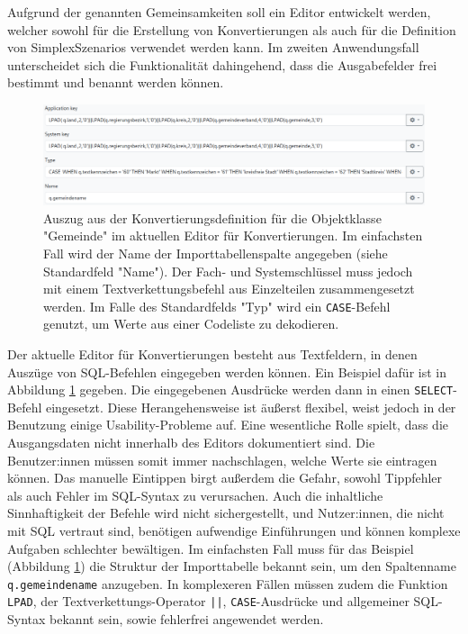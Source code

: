 Aufgrund der genannten Gemeinsamkeiten soll ein Editor entwickelt werden, welcher sowohl für die Erstellung von Konvertierungen als auch für die Definition von SimplexSzenarios verwendet werden kann. Im zweiten Anwendungsfall unterscheidet sich die Funktionalität dahingehend, dass die Ausgabefelder frei bestimmt und benannt werden können.

\begin{figure}[ht]
  \centering
  \includegraphics[width=.95\textwidth]{assets/conversion-gemeinde.png}
  \caption[Auszug einer Konvertierungsdefinition im aktuellen Editor]{Auszug aus der Konvertierungsdefinition für die Objektklasse "Gemeinde" im aktuellen Editor für Konvertierungen. Im einfachsten Fall wird der Name der Importtabellenspalte angegeben (siehe Standardfeld "Name"). Der Fach- und Systemschlüssel muss jedoch mit einem Textverkettungsbefehl aus Einzelteilen zusammengesetzt werden. Im Falle des Standardfelds "Typ" wird ein \texttt{CASE}-Befehl genutzt, um Werte aus einer Codeliste zu dekodieren.}
  \label{fig:conversion-gemeinde}
\end{figure}

Der aktuelle Editor für Konvertierungen besteht aus Textfeldern, in denen Auszüge von \ac{SQL}-Befehlen eingegeben werden können. Ein Beispiel dafür ist in Abbildung \ref{fig:conversion-gemeinde} gegeben. Die eingegebenen Ausdrücke werden dann in einen \texttt{SELECT}-Befehl eingesetzt. Diese Herangehensweise ist äußerst flexibel, weist jedoch in der Benutzung einige Usability-Probleme auf. Eine wesentliche Rolle spielt, dass die Ausgangsdaten nicht innerhalb des Editors dokumentiert sind. Die Benutzer:innen müssen somit immer nachschlagen, welche Werte sie eintragen können. Das manuelle Eintippen birgt außerdem die Gefahr, sowohl Tippfehler als auch Fehler im \ac{SQL}-Syntax zu verursachen. Auch die inhaltliche Sinnhaftigkeit der Befehle wird nicht sichergestellt, und Nutzer:innen, die nicht mit SQL vertraut sind, benötigen aufwendige Einführungen und können komplexe Aufgaben schlechter bewältigen. Im einfachsten Fall muss für das Beispiel (Abbildung \ref{fig:conversion-gemeinde}) die Struktur der Importtabelle bekannt sein, um den Spaltenname \texttt{q.gemeindename} anzugeben. In komplexeren Fällen müssen zudem die Funktion \texttt{LPAD}, der Textverkettungs-Operator \texttt{||}, \texttt{CASE}-Ausdrücke und allgemeiner \ac{SQL}-Syntax bekannt sein, sowie fehlerfrei angewendet werden.

